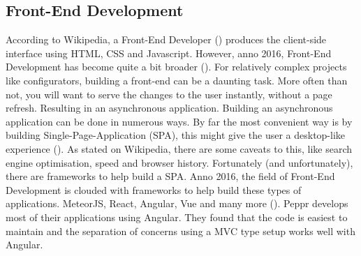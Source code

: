 \subsection{Front-End Development}
According to Wikipedia, a Front-End Developer (\cite{Front-End Developer Definition}) produces the client-side interface using HTML, CSS and Javascript. However, anno 2016, Front-End Development has become quite a bit broader (\cite{Javascript Anno 2016}). For relatively complex projects like configurators, building a front-end can be a daunting task. More often than not, you will want to serve the changes to the user instantly, without a page refresh. Resulting in an asynchronous application.
Building an asynchronous application can be done in numerous ways. By far the most convenient way is by building Single-Page-Application (SPA), this might give the user a desktop-like experience (\cite{Single Page Applications}). As stated on Wikipedia, there are some caveats to this, like search engine optimisation, speed and browser history. Fortunately (and unfortunately), there are frameworks to help build a SPA. Anno 2016, the field of Front-End Development is clouded with frameworks to help build these types of applications. MeteorJS, React, Angular, Vue and many more ().
Peppr develops most of their applications using Angular. They found that the code is easiest to maintain and the separation of concerns using a MVC type setup works well with Angular.

\newpage










